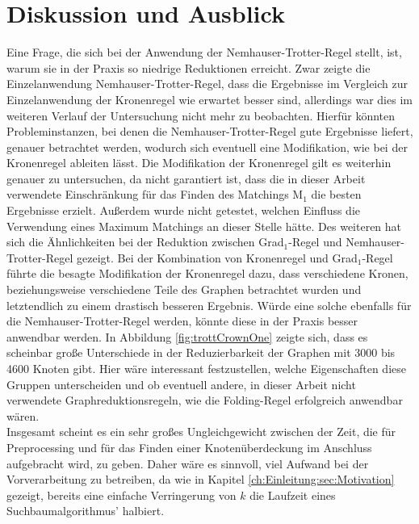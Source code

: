 
\chapter{Diskussion und Ausblick}
\label{ch:fazit}

Eine Frage, die sich bei der Anwendung der Nemhauser-Trotter-Regel stellt, ist, warum sie in der Praxis so niedrige Reduktionen erreicht. Zwar zeigte die Einzelanwendung Nemhauser-Trotter-Regel, dass die Ergebnisse im Vergleich zur Einzelanwendung der Kronenregel wie erwartet besser sind, allerdings war dies im weiteren Verlauf der Untersuchung nicht mehr zu beobachten. Hierfür könnten Probleminstanzen, bei denen die Nemhauser-Trotter-Regel gute Ergebnisse liefert, genauer betrachtet werden, wodurch sich eventuell eine Modifikation, wie bei der Kronenregel ableiten lässt. Die Modifikation der Kronenregel gilt es weiterhin genauer zu untersuchen, da nicht garantiert ist, dass die in dieser Arbeit verwendete Einschränkung für das Finden des Matchings M$_{1}$ die besten Ergebnisse erzielt. Außerdem wurde nicht getestet, welchen Einfluss die Verwendung eines Maximum Matchings an dieser Stelle hätte. Des weiteren hat sich die Ähnlichkeiten bei der Reduktion zwischen Grad$_{1}$-Regel und Nemhauser-Trotter-Regel gezeigt. Bei der Kombination von Kronenregel und Grad$_{1}$-Regel führte die besagte Modifikation der Kronenregel dazu, dass verschiedene Kronen, beziehungsweise verschiedene Teile des Graphen betrachtet wurden und letztendlich zu einem drastisch besseren Ergebnis. Würde eine solche ebenfalls für die Nemhauser-Trotter-Regel werden, könnte diese in der Praxis besser anwendbar werden.
In Abbildung \ref{fig:trottCrownOne} zeigte sich, dass es scheinbar große Unterschiede in der Reduzierbarkeit der Graphen mit 3000 bis 4600 Knoten gibt. Hier wäre interessant festzustellen, welche Eigenschaften diese Gruppen unterscheiden und ob eventuell andere, in dieser Arbeit nicht verwendete Graphreduktionsregeln, wie die Folding-Regel erfolgreich anwendbar wären.\\
Insgesamt scheint es ein sehr großes Ungleichgewicht zwischen der Zeit, die für Preprocessing und für das Finden einer Knotenüberdeckung im Anschluss aufgebracht wird, zu geben. Daher wäre es sinnvoll, viel Aufwand bei der Vorverarbeitung zu betreiben, da wie in Kapitel \ref{ch:Einleitung:sec:Motivation} gezeigt, bereits eine einfache Verringerung von $k$ die Laufzeit eines Suchbaumalgorithmus' halbiert.

